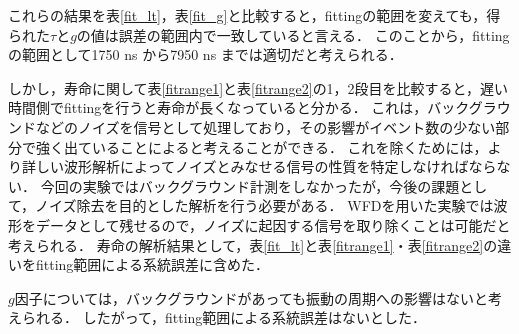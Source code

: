 これらの結果を表\ref{fit_lt}，表\ref{fit_g}と比較すると，fittingの範囲を変えても，得られた$\tau$と$g$の値は誤差の範囲内で一致していると言える．
このことから，fittingの範囲として1750 ns から7950 ns までは適切だと考えられる．

しかし，寿命に関して表\ref{fitrange1}と表\ref{fitrange2}の1，2段目を比較すると，遅い時間側でfittingを行うと寿命が長くなっていると分かる．
これは，バックグラウンドなどのノイズを信号として処理しており，その影響がイベント数の少ない部分で強く出ていることによると考えることができる．
これを除くためには，より詳しい波形解析によってノイズとみなせる信号の性質を特定しなければならない．
今回の実験ではバックグラウンド計測をしなかったが，今後の課題として，ノイズ除去を目的とした解析を行う必要がある．
WFDを用いた実験では波形をデータとして残せるので，ノイズに起因する信号を取り除くことは可能だと考えられる．%
寿命の解析結果として，表\ref{fit_lt}と表\ref{fitrange1}・表\ref{fitrange2}の違いをfitting範囲による系統誤差に含めた．%

$g$因子については，バックグラウンドがあっても振動の周期への影響はないと考えられる．%
したがって，fitting範囲による系統誤差はないとした．


%
